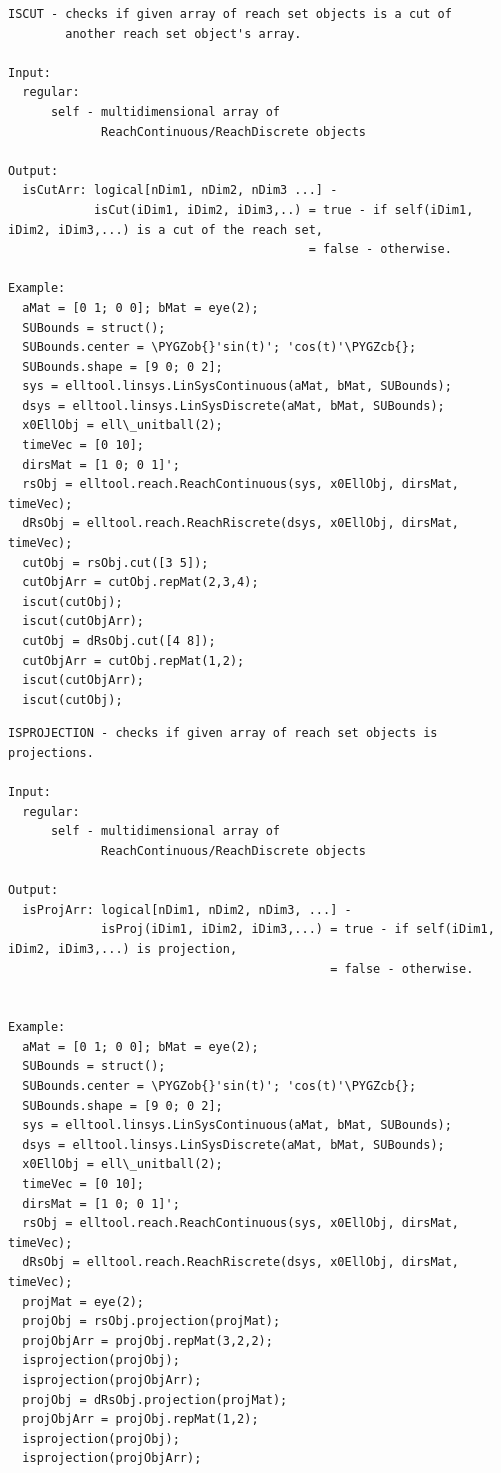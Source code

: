\documentclass[letterpaper,10pt,english]{sphinxmanual}
\def\PYGZob{\char`\{}
\def\PYGZcb{\char`\}}
\begin{document}
\begin{Verbatim}[commandchars=\\\{\}]
ISCUT - checks if given array of reach set objects is a cut of
        another reach set object's array.

Input:
  regular:
      self - multidimensional array of
             ReachContinuous/ReachDiscrete objects

Output:
  isCutArr: logical[nDim1, nDim2, nDim3 ...] -
            isCut(iDim1, iDim2, iDim3,..) = true - if self(iDim1, iDim2, iDim3,...) is a cut of the reach set,
                                          = false - otherwise.

Example:
  aMat = [0 1; 0 0]; bMat = eye(2);
  SUBounds = struct();
  SUBounds.center = \PYGZob{}'sin(t)'; 'cos(t)'\PYGZcb{};
  SUBounds.shape = [9 0; 0 2];
  sys = elltool.linsys.LinSysContinuous(aMat, bMat, SUBounds);
  dsys = elltool.linsys.LinSysDiscrete(aMat, bMat, SUBounds);
  x0EllObj = ell\_unitball(2);
  timeVec = [0 10];
  dirsMat = [1 0; 0 1]';
  rsObj = elltool.reach.ReachContinuous(sys, x0EllObj, dirsMat, timeVec);
  dRsObj = elltool.reach.ReachRiscrete(dsys, x0EllObj, dirsMat, timeVec);
  cutObj = rsObj.cut([3 5]);
  cutObjArr = cutObj.repMat(2,3,4);
  iscut(cutObj);
  iscut(cutObjArr);
  cutObj = dRsObj.cut([4 8]);
  cutObjArr = cutObj.repMat(1,2);
  iscut(cutObjArr);
  iscut(cutObj);
\end{Verbatim}

\begin{Verbatim}[commandchars=\\\{\}]
ISPROJECTION - checks if given array of reach set objects is projections.

Input:
  regular:
      self - multidimensional array of
             ReachContinuous/ReachDiscrete objects

Output:
  isProjArr: logical[nDim1, nDim2, nDim3, ...] -
             isProj(iDim1, iDim2, iDim3,...) = true - if self(iDim1, iDim2, iDim3,...) is projection,
                                             = false - otherwise.


Example:
  aMat = [0 1; 0 0]; bMat = eye(2);
  SUBounds = struct();
  SUBounds.center = \PYGZob{}'sin(t)'; 'cos(t)'\PYGZcb{};
  SUBounds.shape = [9 0; 0 2];
  sys = elltool.linsys.LinSysContinuous(aMat, bMat, SUBounds);
  dsys = elltool.linsys.LinSysDiscrete(aMat, bMat, SUBounds);
  x0EllObj = ell\_unitball(2);
  timeVec = [0 10];
  dirsMat = [1 0; 0 1]';
  rsObj = elltool.reach.ReachContinuous(sys, x0EllObj, dirsMat, timeVec);
  dRsObj = elltool.reach.ReachRiscrete(dsys, x0EllObj, dirsMat, timeVec);
  projMat = eye(2);
  projObj = rsObj.projection(projMat);
  projObjArr = projObj.repMat(3,2,2);
  isprojection(projObj);
  isprojection(projObjArr);
  projObj = dRsObj.projection(projMat);
  projObjArr = projObj.repMat(1,2);
  isprojection(projObj);
  isprojection(projObjArr);
\end{Verbatim}
\end{document}
